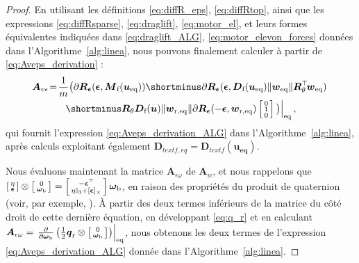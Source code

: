 \begin{proof}
En utilisant les définitions \eqref{eq:diffR_eps}, \eqref{eq:diffRtop}, ainsi que les expressions \eqref{eq:diffRsparse}, \eqref{eq:draglift}, \eqref{eq:motor_el}, et leurs formes équivalentes indiquées dans \eqref{eq:draglift_ALG}, \eqref{eq:motor_elevon_forces} données dans l'Algorithme~\ref{alg:linea}, nous pouvons finalement calculer à partir de \eqref{eq:Aveps_derivation} : 
\begin{multline*}
    \!\boldsymbol{A}_{v\epsilon} \!=\! \frac{1}{m} \big( \partial \boldsymbol{R}_{\boldsymbol{ \epsilon}} (\boldsymbol{ \epsilon} , \boldsymbol{M}_{\text{f}}(\boldsymbol{u_{\text{eq}}}))  \shortminus \partial \boldsymbol{R}_{\boldsymbol{ \epsilon}} ( \boldsymbol{ \epsilon} ,\boldsymbol{D}_{\text{f}}(\boldsymbol{u_{\text{eq}}})  \lVert \boldsymbol{w}_{\mathrm{eq}} \rVert  \boldsymbol{R}_\theta^\top \! \boldsymbol{w}_{\mathrm{eq}})  \\    \left. \shortminus  \boldsymbol{R}_\theta \boldsymbol{D}_{\text{f}}(\boldsymbol{u})  \lVert \boldsymbol{w}_{\mathrm{r,eq}} \rVert \partial \boldsymbol{R}_{\boldsymbol{ \epsilon}}( -\boldsymbol{ \epsilon}, \boldsymbol{w}_{\mathrm{r,eq}})\smallmat{0\\ 1\\ 0} \big)\right|_{\mathrm{eq}},
\end{multline*}
qui fournit l'expression \eqref{eq:Aveps_derivation_ALG} dans l'Algorithme~\ref{alg:linea}, après calculs exploitant également $\boldsymbol{D}_{text{f,eq}} = \boldsymbol{D}_{text{f}}(\boldsymbol{u_{\text{eq}}})$.

Nous évaluons maintenant la matrice $\boldsymbol{A}_{\epsilon \omega}$ de  $\boldsymbol{A}_{w}$, et nous rappelons que 
$\left[ \begin{smallmatrix}\eta \\ \boldsymbol{\epsilon} \end{smallmatrix} \right] \otimes \left[ \begin{smallmatrix}0 \\ 
\boldsymbol{\omega}_{\mathrm{b}} \end{smallmatrix} \right] = 
\left[ \begin{smallmatrix} - \boldsymbol{\epsilon}^\top  \\ 
\eta \mathbb{I}_{3}   + [ \boldsymbol{\epsilon}]_{\times} 
 \end{smallmatrix} \right] \boldsymbol{\omega}_{\mathrm{b}}$, en raison des propriétés du produit de quaternion (voir, par exemple, \cite{hamel_minhduc}). 
À partir des deux termes inférieurs de la matrice du côté droit de cette dernière équation, en développant \eqref{eq:q_r}
et en calculant $\boldsymbol{A}_{\epsilon \omega} = \left. \frac{\partial }{\partial \boldsymbol{\omega}_{\text{b}}} \left( \frac{1}{2} \boldsymbol{{q}}_{\text{r}}  \otimes \left[ \begin{smallmatrix}0 \\ \boldsymbol{\omega}_{\text{b}} \end{smallmatrix} \right] \right) \right|_{\mathrm{eq}}$, nous obtenons les deux termes de l'expression \eqref{eq:Aveps_derivation_ALG} donnée dans l'Algorithme~\ref{alg:linea}.


\end{proof}
